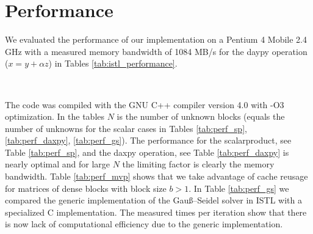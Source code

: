 \documentclass[11pt]{article}
\begin{document}
{\section{Performance}
We evaluated the performance of our implementation on a Pentium 4 Mobile
2.4 GHz with a measured memory bandwidth of 1084 MB/s for the daypy
operation ($x = y + \alpha z$) in Tables
\ref{tab:istl_performance}. 
\begin{table}[htb]
  \centering
  \caption{Performance Tests}
  \label{tab:istl_performance}
  \mbox{\small
    }
  \mbox{\small
    }
\end{table}
The code was compiled with the GNU C++
compiler version 4.0 with -O3 optimization. In the tables $N$ is the
number of 
unknown blocks (equals the number of unknowns for the scalar cases in
Tables \ref{tab:perf_sp}, \ref{tab:perf_daxpy}, \ref{tab:perf_gs}).
The performance for the scalarproduct,
see Table \ref{tab:perf_sp},
and the daxpy operation, see Table \ref{tab:perf_daxpy}  is nearly
optimal and for large $N$ the limiting factor is clearly the memory
bandwidth. Table \ref{tab:perf_mvp} shows that we take advantage of
cache reusage for matrices of dense blocks with block size $b>1$.
In Table
\ref{tab:perf_gs} we compared the generic implementation of
the Gau\ss{}--Seidel solver in ISTL with a specialized C
implementation. The measured times per iteration show that there is
now lack of computational efficiency due to the generic implementation. 

}
\end{document}
